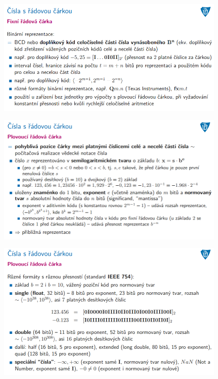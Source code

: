 \documentclass[10pt,a4paper]{article}
\begin{document}
\begin{figure} [h]
	\includegraphics[scale=0.65]{img/prvni_odstavec/otazka3/cisla_s_radovou_carkou5.png}	
\end{figure}

\begin{figure} [h]
	\includegraphics[scale=0.65]{img/prvni_odstavec/otazka3/cisla_s_radovou_carkou6.png}	
\end{figure}

\begin{figure} [h]
	\includegraphics[scale=0.65]{img/prvni_odstavec/otazka3/cisla_s_radovou_carkou7.png}	
\end{figure}
\end{document}
